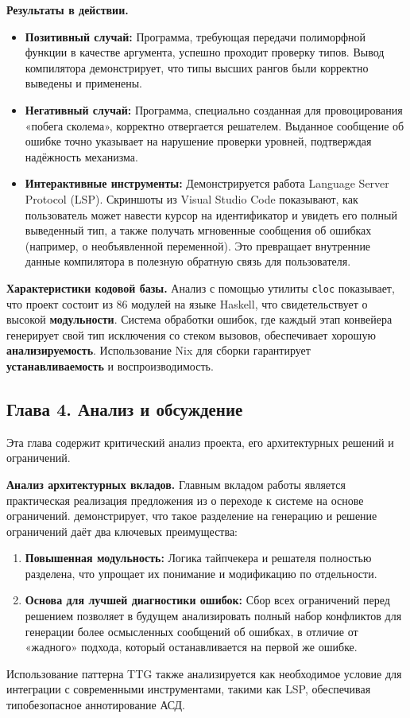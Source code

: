 \textbf{Результаты в действии.}
\begin{itemize}
    \item \textbf{Позитивный случай:} Программа, требующая передачи полиморфной функции в качестве аргумента, успешно проходит проверку типов. Вывод компилятора демонстрирует, что типы высших рангов были корректно выведены и применены.
    \item \textbf{Негативный случай:} Программа, специально созданная для провоцирования «побега сколема», корректно отвергается решателем. Выданное сообщение об ошибке точно указывает на нарушение проверки уровней, подтверждая надёжность механизма.
    \item \textbf{Интерактивные инструменты:} Демонстрируется работа Language Server Protocol (LSP). Скриншоты из Visual Studio Code показывают, как пользователь может навести курсор на идентификатор и увидеть его полный выведенный тип, а также получать мгновенные сообщения об ошибках (например, о необъявленной переменной). Это превращает внутренние данные компилятора в полезную обратную связь для пользователя.
\end{itemize}

\textbf{Характеристики кодовой базы.} Анализ с помощью утилиты \texttt{cloc} показывает, что проект состоит из 86 модулей на языке Haskell, что свидетельствует о высокой \textbf{модульности}. Система обработки ошибок, где каждый этап конвейера генерирует свой тип исключения со стеком вызовов, обеспечивает хорошую \textbf{анализируемость}. Использование Nix для сборки гарантирует \textbf{устанавливаемость} и воспроизводимость.

\newpage

\subsection*{Глава 4. Анализ и обсуждение}

Эта глава содержит критический анализ проекта, его архитектурных решений и ограничений.

\textbf{Анализ архитектурных вкладов.} Главным вкладом работы является практическая реализация предложения из \cite[Sec. 9.6]{jones-practical-2007} о переходе к системе на основе ограничений. \Arralac демонстрирует, что такое разделение на генерацию и решение ограничений даёт два ключевых преимущества:
\begin{enumerate}
    \item \textbf{Повышенная модульность:} Логика тайпчекера и решателя полностью разделена, что упрощает их понимание и модификацию по отдельности.
    \item \textbf{Основа для лучшей диагностики ошибок:} Сбор всех ограничений перед решением позволяет в будущем анализировать полный набор конфликтов для генерации более осмысленных сообщений об ошибках, в отличие от «жадного» подхода, который останавливается на первой же ошибке.
\end{enumerate}
Использование паттерна TTG также анализируется как необходимое условие для интеграции с современными инструментами, такими как LSP, обеспечивая типобезопасное аннотирование АСД.

